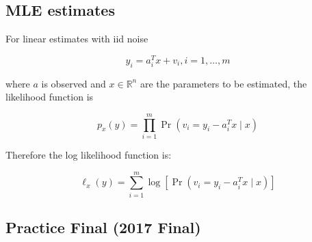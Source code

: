 \subsection{MLE estimates}

For linear estimates with iid noise

\[
y_i = a_i^T x + v_i, i = 1, \ldots, m
\]

where \(a\) is observed and \(x \in \mathbb{R}^n\) are the parameters to be estimated, the likelihood function is

\[
p_x(y) = \prod_{i=1}^m \Pr(v_i = y_i - a_i^Tx \mid x)
\]

Therefore the log likelihood function is:

\[
\ell_x (y) = \sum_{i=1}^m \log[ \Pr(v_i = y_i - a_i^Tx \mid x)]
\]

\subsection{Practice Final (2017 Final)}

